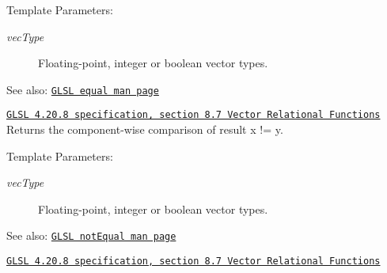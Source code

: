 \begin{Desc}
\item[Template Parameters:]
\begin{description}
\item[{\em vecType}]Floating-point, integer or boolean vector types.\end{description}
\end{Desc}
\begin{Desc}
\item[See also:]\href{http://www.opengl.org/sdk/docs/manglsl/xhtml/equal.xml}{\tt GLSL equal man page} 

\href{http://www.opengl.org/registry/doc/GLSLangSpec.4.20.8.pdf}{\tt GLSL 4.20.8 specification, section 8.7 Vector Relational Functions} Returns the component-wise comparison of result x != y.\end{Desc}
\begin{Desc}
\item[Template Parameters:]
\begin{description}
\item[{\em vecType}]Floating-point, integer or boolean vector types.\end{description}
\end{Desc}
\begin{Desc}
\item[See also:]\href{http://www.opengl.org/sdk/docs/manglsl/xhtml/notEqual.xml}{\tt GLSL notEqual man page} 

\href{http://www.opengl.org/registry/doc/GLSLangSpec.4.20.8.pdf}{\tt GLSL 4.20.8 specification, section 8.7 Vector Relational Functions} \end{Desc}
